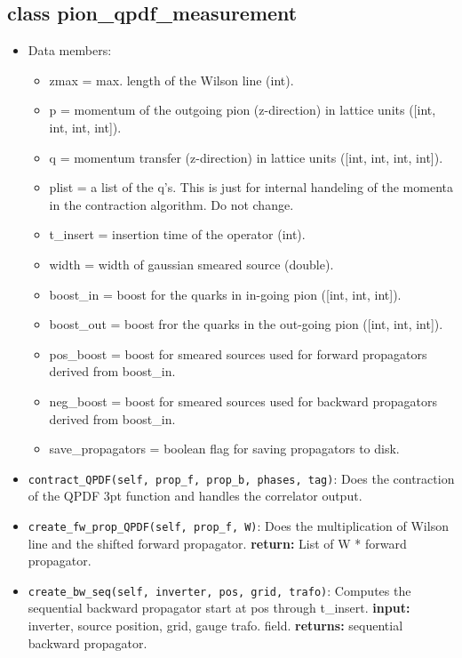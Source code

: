 \documentclass[a4paper,10pt]{scrartcl}
\begin{document}


\subsection{class pion\_qpdf\_measurement}
\begin{itemize}
    \item Data members:
        \begin{itemize}
            \item zmax = max. length of the Wilson line (int).
            \item p = momentum of the outgoing pion (z-direction) in lattice units ([int, int, int, int]).
            \item q = momentum transfer (z-direction) in lattice units ([int, int, int, int]).
            \item plist = a list of the q's. This is just for internal handeling of the momenta in the contraction algorithm. Do not change.
            \item t\_insert = insertion time of the operator (int).
            \item width = width of gaussian smeared source (double).
            \item boost\_in = boost for the quarks in in-going pion ([int, int, int]).   
            \item boost\_out = boost fror the quarks in the out-going pion ([int, int, int]).
            \item pos\_boost = boost for smeared sources used for forward propagators derived from boost\_in.
            \item neg\_boost = boost for smeared sources used for backward propagators derived from boost\_in.
            \item save\_propagators = boolean flag for saving propagators to disk.
        \end{itemize}
    \item \lstinline{contract_QPDF(self, prop_f, prop_b, phases, tag)}: Does the contraction of the QPDF 3pt function and handles the correlator output.
    \item \lstinline{create_fw_prop_QPDF(self, prop_f, W)}: Does the multiplication of Wilson line and the shifted forward propagator.
           \newline \textbf{return:} List of W * forward propagator.
    \item \lstinline{create_bw_seq(self, inverter, pos, grid, trafo)}: Computes the sequential backward propagator start at pos through t\_insert. 
            \newline \textbf{input:} inverter, source position, grid, gauge trafo. field.
            \newline \textbf{returns:} sequential backward propagator.
\end{itemize}
\end{document}
